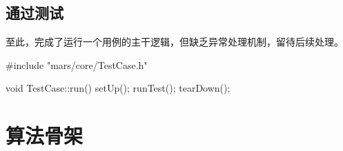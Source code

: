 \begin{content}
\subsection{通过测试}

至此，完成了运行一个用例的主干逻辑，但缺乏异常处理机制，留待后续处理。

\begin{leftbar}
 \begin{c++}[caption={\ttfamily{src/mars/core/TestCase.cc}}]
#include "mars/core/TestCase.h"

void TestCase::run() {
  setUp();
  runTest();
  tearDown();
}
 \end{c++}
\end{leftbar}

\end{content}

\section{算法骨架}

